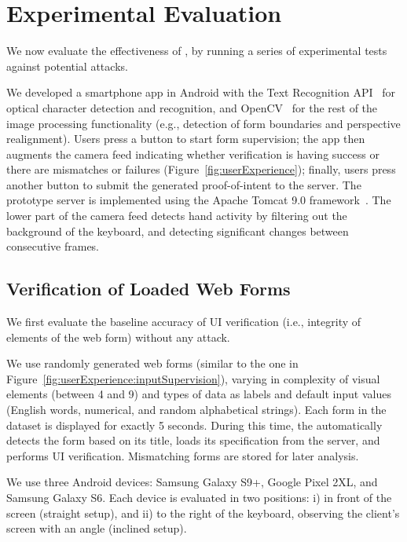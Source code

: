 \section{Experimental Evaluation} \label{sec:experimentalEvaluation}

We now evaluate the effectiveness of \sysname, by running a series of experimental tests against potential attacks.

We developed a smartphone app in Android with the Text Recognition API~\cite{googleOCR} for optical character detection and recognition, and OpenCV~\cite{openCV} for the rest of the image processing functionality (e.g., detection of form boundaries and perspective realignment).
Users press a button to start form supervision; the app then augments the camera feed indicating whether verification is having success or there are mismatches or failures (Figure~\ref{fig:userExperience}); finally, users press another button to submit the generated proof-of-intent to the server.  The prototype server is implemented using the Apache Tomcat 9.0 framework~\cite{ApacheTomcat}. The lower part of the camera feed detects hand activity by filtering out the background of the keyboard, and detecting significant changes between consecutive frames.

\subsection{Verification of Loaded Web Forms} \label{ssec:UIVerificationEvaluation}

We first evaluate the baseline accuracy of UI verification (i.e., integrity of elements of the web form) without any attack.


We use \numforms randomly generated web forms (similar to the one in Figure~\ref{fig:userExperience:inputSupervision}), varying in complexity of visual elements (between 4 and 9) and types of data as labels and default input values (English words, numerical, and random alphabetical strings).
Each form in the dataset is displayed for exactly 5 seconds.
During this time, the \app automatically detects the form based on its title, loads its specification from the server, and performs UI verification.
Mismatching forms are stored for later analysis.

We use three Android devices: Samsung Galaxy S9+, Google Pixel 2XL, and Samsung Galaxy S6. Each device is evaluated in two positions: i) in front of the screen (straight setup), and ii) to the right of the keyboard, observing the client's screen with an angle (inclined setup).

